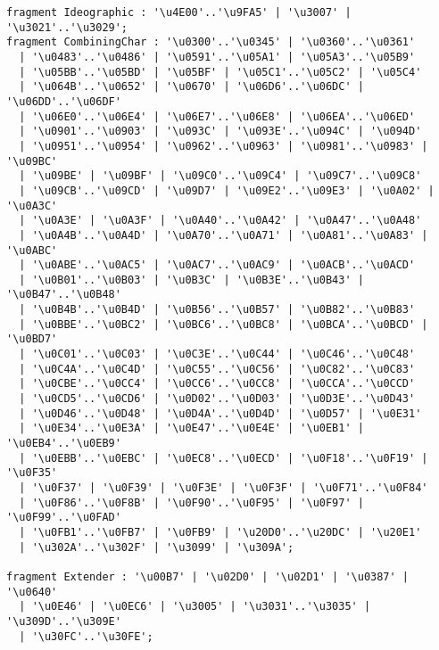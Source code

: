 \begin{verbatim}
fragment Ideographic : '\u4E00'..'\u9FA5' | '\u3007' | '\u3021'..'\u3029'; 
fragment CombiningChar : '\u0300'..'\u0345' | '\u0360'..'\u0361' 
  | '\u0483'..'\u0486' | '\u0591'..'\u05A1' | '\u05A3'..'\u05B9' 
  | '\u05BB'..'\u05BD' | '\u05BF' | '\u05C1'..'\u05C2' | '\u05C4' 
  | '\u064B'..'\u0652' | '\u0670' | '\u06D6'..'\u06DC' | '\u06DD'..'\u06DF' 
  | '\u06E0'..'\u06E4' | '\u06E7'..'\u06E8' | '\u06EA'..'\u06ED' 
  | '\u0901'..'\u0903' | '\u093C' | '\u093E'..'\u094C' | '\u094D' 
  | '\u0951'..'\u0954' | '\u0962'..'\u0963' | '\u0981'..'\u0983' | '\u09BC' 
  | '\u09BE' | '\u09BF' | '\u09C0'..'\u09C4' | '\u09C7'..'\u09C8' 
  | '\u09CB'..'\u09CD' | '\u09D7' | '\u09E2'..'\u09E3' | '\u0A02' | '\u0A3C' 
  | '\u0A3E' | '\u0A3F' | '\u0A40'..'\u0A42' | '\u0A47'..'\u0A48' 
  | '\u0A4B'..'\u0A4D' | '\u0A70'..'\u0A71' | '\u0A81'..'\u0A83' | '\u0ABC' 
  | '\u0ABE'..'\u0AC5' | '\u0AC7'..'\u0AC9' | '\u0ACB'..'\u0ACD' 
  | '\u0B01'..'\u0B03' | '\u0B3C' | '\u0B3E'..'\u0B43' | '\u0B47'..'\u0B48' 
  | '\u0B4B'..'\u0B4D' | '\u0B56'..'\u0B57' | '\u0B82'..'\u0B83' 
  | '\u0BBE'..'\u0BC2' | '\u0BC6'..'\u0BC8' | '\u0BCA'..'\u0BCD' | '\u0BD7' 
  | '\u0C01'..'\u0C03' | '\u0C3E'..'\u0C44' | '\u0C46'..'\u0C48' 
  | '\u0C4A'..'\u0C4D' | '\u0C55'..'\u0C56' | '\u0C82'..'\u0C83' 
  | '\u0CBE'..'\u0CC4' | '\u0CC6'..'\u0CC8' | '\u0CCA'..'\u0CCD' 
  | '\u0CD5'..'\u0CD6' | '\u0D02'..'\u0D03' | '\u0D3E'..'\u0D43' 
  | '\u0D46'..'\u0D48' | '\u0D4A'..'\u0D4D' | '\u0D57' | '\u0E31' 
  | '\u0E34'..'\u0E3A' | '\u0E47'..'\u0E4E' | '\u0EB1' | '\u0EB4'..'\u0EB9'
  | '\u0EBB'..'\u0EBC' | '\u0EC8'..'\u0ECD' | '\u0F18'..'\u0F19' | '\u0F35' 
  | '\u0F37' | '\u0F39' | '\u0F3E' | '\u0F3F' | '\u0F71'..'\u0F84' 
  | '\u0F86'..'\u0F8B' | '\u0F90'..'\u0F95' | '\u0F97' | '\u0F99'..'\u0FAD' 
  | '\u0FB1'..'\u0FB7' | '\u0FB9' | '\u20D0'..'\u20DC' | '\u20E1' 
  | '\u302A'..'\u302F' | '\u3099' | '\u309A';

fragment Extender : '\u00B7' | '\u02D0' | '\u02D1' | '\u0387' | '\u0640' 
  | '\u0E46' | '\u0EC6' | '\u3005' | '\u3031'..'\u3035' | '\u309D'..'\u309E' 
  | '\u30FC'..'\u30FE';
  
\end{verbatim}